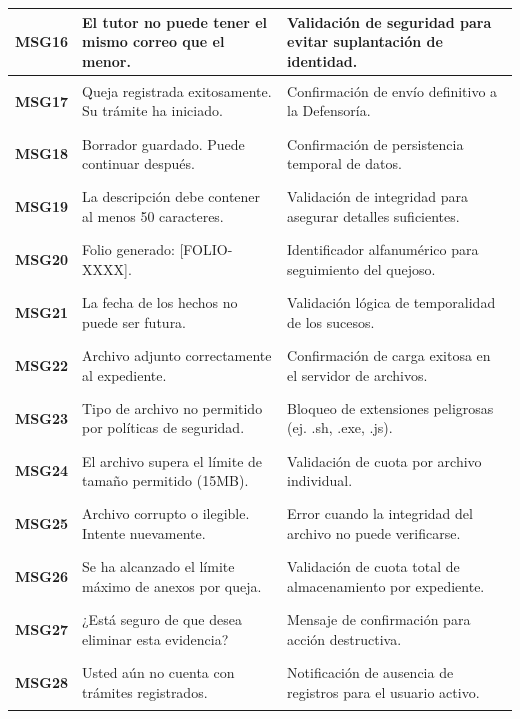 \begin{longtable}{|p{2cm}|p{6cm}|p{6cm}|}
    \hypertarget{msg:MSG16}{\textbf{MSG16}} & El tutor no puede tener el mismo correo que el menor. & Validación de seguridad para evitar suplantación de identidad. \\ \hline
    \hypertarget{msg:MSG17}{\textbf{MSG17}} & Queja registrada exitosamente. Su trámite ha iniciado. & Confirmación de envío definitivo a la Defensoría. \\ \hline
    \hypertarget{msg:MSG18}{\textbf{MSG18}} & Borrador guardado. Puede continuar después. & Confirmación de persistencia temporal de datos. \\ \hline
    \hypertarget{msg:MSG19}{\textbf{MSG19}} & La descripción debe contener al menos 50 caracteres. & Validación de integridad para asegurar detalles suficientes. \\ \hline
    \hypertarget{msg:MSG20}{\textbf{MSG20}} & Folio generado: [FOLIO-XXXX]. & Identificador alfanumérico para seguimiento del quejoso. \\ \hline
    \hypertarget{msg:MSG21}{\textbf{MSG21}} & La fecha de los hechos no puede ser futura. & Validación lógica de temporalidad de los sucesos. \\ \hline
    \hypertarget{msg:MSG22}{\textbf{MSG22}} & Archivo adjunto correctamente al expediente. & Confirmación de carga exitosa en el servidor de archivos. \\ \hline
    \hypertarget{msg:MSG23}{\textbf{MSG23}} & Tipo de archivo no permitido por políticas de seguridad. & Bloqueo de extensiones peligrosas (ej. .sh, .exe, .js). \\ \hline
    \hypertarget{msg:MSG24}{\textbf{MSG24}} & El archivo supera el límite de tamaño permitido (15MB). & Validación de cuota por archivo individual. \\ \hline
    \hypertarget{msg:MSG25}{\textbf{MSG25}} & Archivo corrupto o ilegible. Intente nuevamente. & Error cuando la integridad del archivo no puede verificarse. \\ \hline
    \hypertarget{msg:MSG26}{\textbf{MSG26}} & Se ha alcanzado el límite máximo de anexos por queja. & Validación de cuota total de almacenamiento por expediente. \\ \hline
    \hypertarget{msg:MSG27}{\textbf{MSG27}} & ¿Está seguro de que desea eliminar esta evidencia? & Mensaje de confirmación para acción destructiva. \\ \hline
    \hypertarget{msg:MSG28}{\textbf{MSG28}} & Usted aún no cuenta con trámites registrados. & Notificación de ausencia de registros para el usuario activo. \\ \hline

\end{longtable}
